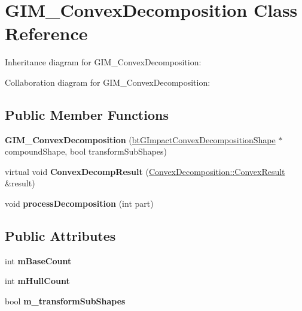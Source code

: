 \hypertarget{class_g_i_m___convex_decomposition}{\section{G\+I\+M\+\_\+\+Convex\+Decomposition Class Reference}
\label{class_g_i_m___convex_decomposition}
}


Inheritance diagram for G\+I\+M\+\_\+\+Convex\+Decomposition\+:


Collaboration diagram for G\+I\+M\+\_\+\+Convex\+Decomposition\+:
\subsection*{Public Member Functions}
\begin{DoxyCompactItemize}
\item 
\hypertarget{class_g_i_m___convex_decomposition_ad92116188015da32bfc21b19577fa4b1}{{\bfseries G\+I\+M\+\_\+\+Convex\+Decomposition} (\hyperlink{classbt_g_impact_convex_decomposition_shape}{bt\+G\+Impact\+Convex\+Decomposition\+Shape} $\ast$compound\+Shape, bool transform\+Sub\+Shapes)}\label{class_g_i_m___convex_decomposition_ad92116188015da32bfc21b19577fa4b1}

\item 
\hypertarget{class_g_i_m___convex_decomposition_a2cc50eca875ccbbb4e3d9f86824a27a5}{virtual void {\bfseries Convex\+Decomp\+Result} (\hyperlink{class_convex_decomposition_1_1_convex_result}{Convex\+Decomposition\+::\+Convex\+Result} \&result)}\label{class_g_i_m___convex_decomposition_a2cc50eca875ccbbb4e3d9f86824a27a5}

\item 
\hypertarget{class_g_i_m___convex_decomposition_a4fa5507fce6bfa1870c838665f7ca10d}{void {\bfseries process\+Decomposition} (int part)}\label{class_g_i_m___convex_decomposition_a4fa5507fce6bfa1870c838665f7ca10d}

\end{DoxyCompactItemize}
\subsection*{Public Attributes}
\begin{DoxyCompactItemize}
\item 
\hypertarget{class_g_i_m___convex_decomposition_a00d23dc036a0d6c10b0fb59221721469}{int {\bfseries m\+Base\+Count}}\label{class_g_i_m___convex_decomposition_a00d23dc036a0d6c10b0fb59221721469}

\item 
\hypertarget{class_g_i_m___convex_decomposition_a0763a8311c012e4d89e48af18af71f5f}{int {\bfseries m\+Hull\+Count}}\label{class_g_i_m___convex_decomposition_a0763a8311c012e4d89e48af18af71f5f}

\item 
\hypertarget{class_g_i_m___convex_decomposition_a90f1968c6a20434f96044dd0a533a91b}{bool {\bfseries m\+\_\+transform\+Sub\+Shapes}}\label{class_g_i_m___convex_decomposition_a90f1968c6a20434f96044dd0a533a91b}

\end{DoxyCompactItemize}

